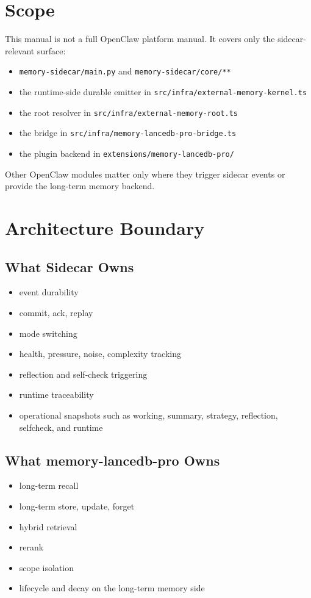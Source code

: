 \documentclass[11pt,a4paper,oneside,openany]{book}
\begin{document}
\chapter{Scope}
This manual is not a full OpenClaw platform manual. It covers only the sidecar-relevant surface:
\begin{itemize}
  \item \texttt{memory-sidecar/main.py} and \texttt{memory-sidecar/core/**}
  \item the runtime-side durable emitter in \texttt{src/infra/external-memory-kernel.ts}
  \item the root resolver in \texttt{src/infra/external-memory-root.ts}
  \item the bridge in \texttt{src/infra/memory-lancedb-pro-bridge.ts}
  \item the plugin backend in \texttt{extensions/memory-lancedb-pro/}
\end{itemize}
Other OpenClaw modules matter only where they trigger sidecar events or provide the long-term memory backend.
\chapter{Architecture Boundary}
\section{What Sidecar Owns}
\begin{itemize}
  \item event durability
  \item commit, ack, replay
  \item mode switching
  \item health, pressure, noise, complexity tracking
  \item reflection and self-check triggering
  \item runtime traceability
  \item operational snapshots such as working, summary, strategy, reflection, selfcheck, and runtime
\end{itemize}
\section{What memory-lancedb-pro Owns}
\begin{itemize}
  \item long-term recall
  \item long-term store, update, forget
  \item hybrid retrieval
  \item rerank
  \item scope isolation
  \item lifecycle and decay on the long-term memory side
\end{itemize}
\end{document}
